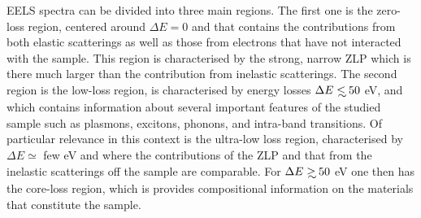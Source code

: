 EELS spectra can be divided into three main regions.
%
The first one is the zero-loss region, centered around $\Delta E=0$
and that contains the contributions from both elastic scatterings
as well as those from electrons that have not interacted with the
sample.
%
This region is characterised by the strong, narrow ZLP which is there  much larger than the contribution
from inelastic scatterings.
%
The second region is the low-loss region, is characterised by energy losses
$\Delta E \lsim 50$ eV, and which contains information
about several important features of the studied sample such as plasmons, excitons, phonons, and
intra-band transitions.
%
Of particular relevance in this context is the ultra-low loss region, characterised by $\Delta E \simeq$ few eV
and where the contributions of the ZLP and that from the inelastic scatterings
off the sample are comparable.
%
For $\Delta E \gsim 50$ eV one then has the core-loss region,
which is provides compositional information
on the materials that constitute the sample.
 
